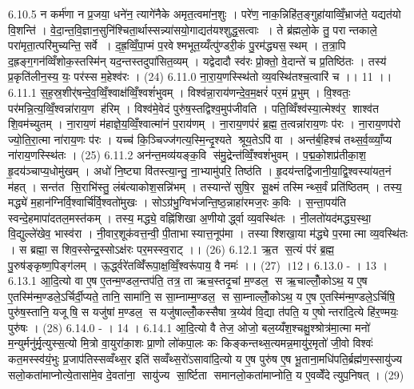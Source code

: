 6.10.5
न कर्म॑णा न प्र॒जया॒ धने॑न॒ त्यागे॑नैके अमृत॒त्वमा॑न॒शुः । परे॑ण॒ नाक॒न्निहि॑त॒ङ्गुहा॑याव्विँ॒भ्राज॑ते॒ यद्यत॑यो वि॒शन्ति॑ । वे॒दा॒न्त॒वि॒ज्ञान॒सुनि॑श्चिता॒र्थास्सन्न्या॑सयो॒गाद्यत॑यश्शुद्ध॒सत्वाः । ते ब्र॑ह्मलो॒के तु॒ परान्तकाले॒ परा॑मृता॒त्परि॑मुच्यन्ति॒ सर्वे । द॒ह्र॒व्विँ॒पा॒प्मं प॒रवेश्मभूत॒य्यँत्पु॑ण्डरी॒कं पु॒रम॑द्ध्यस॒॒स्थम् । त॒त्रा॒पि द॒ह्रङ्ग॒गन॑व्विँशोक॒स्तस्मि॑न् यद॒न्तस्तदुपा॑सित॒व्यम् । यद्वेदादौ स्व॑रः प्रो॒क्तो॒ वे॒दान्ते॑ च प्र॒तिष्ठि॑तः । तस्य॑ प्र॒कृति॑लीन॒स्य॒ यः॒ पर॑स्स म॒हेश्व॑रः । (24)
6.11.0
ना॒रा॒य॒णस्स्थि॑तो व्य॒वस्थि॑तश्च॒त्वारि॑ च ।। 11 ।।
6.11.1
स॒ह॒स्र॒शीर्॑षन्दे॒व॒व्विँ॒श्वाक्ष॑व्विँ॒श्वशं॑भुवम् । विश्व॑न्ना॒राय॑णन्दे॒व॒म॒क्षरं॑ पर॒मं प्र॒भुम् । वि॒श्वतः॒ पर॑मन्नि॒त्य॒व्विँ॒श्वन्ना॑राय॒ण ह॑रिम् । विश्व॑मे॒वेदं पुरु॑ष॒स्तद्विश्व॒मुप॑जीवति । पति॒व्विँश्व॑स्या॒त्मेश्व॑र॒॒ शाश्व॑त शि॒वम॑च्युतम् । ना॒राय॒णं म॑हाज्ञे॒य॒व्विँ॒श्वात्मा॑नं प॒राय॑णम् । ना॒राय॒णप॑रं ब्र॒ह्म॒ त॒त्वन्ना॑राय॒णः प॑रः । ना॒राय॒णप॑रो ज्यो॒ति॒रा॒त्मा ना॑राय॒णः प॑रः । यच्च॑ कि॒ञ्चिज्ज॑गत्य॒स्मि॒न्दृ॒श्यते श्रूय॒तेऽपि॑ वा । अन्त॑र्ब॒हिश्च॑ तथ्स॒र्व॒व्व्याँ॒प्य ना॑राय॒णस्स्थि॑तः । (25)
6.11.2
अन॑न्त॒मव्य॑यङ्क॒वि स॑मु॒द्रेन्त॑व्विँ॒श्वशं॑भुवम् । प॒द्म॒को॒शप्र॑तीका॒श॒॒ हृ॒दय॑ञ्चाप्य॒धोमु॑खम् । अधो॑ नि॒ष्ट्या वि॑तस्त्या॒न्तु॒ ना॒भ्यामु॑परि॒ तिष्ठ॑ति । हृ॒दय॑न्तद्वि॑जानी॒या॒द्वि॒श्वस्या॑यत॒नं म॑हत् । सन्त॑त सि॒राभि॑स्तु॒ लंब॑त्याकोश॒सन्नि॑भम् । तस्यान्ते॑ सुषि॒र सू॒क्ष्मं तस्मिन्थ्स॒र्वं प्रति॑ष्ठितम् । तस्य॒ मद्ध्ये॑ म॒हान॑ग्निर्वि॒श्वार्चि॑र्वि॒श्वतो॑मुखः । सोऽग्र॑भु॒ग्विभ॑जन्ति॒ष्ठ॒न्नाहा॑रमज॒रः क॒विः । स॒न्ता॒पय॑ति स्वन्दे॒हमापा॑दतल॒मस्त॑कम् । तस्य॒ मद्ध्ये॒ वह्नि॑शिखा अ॒णीयोर्द्ध्वा व्य॒वस्थि॑तः । नी॒लतो॑यद॑मद्ध्य॒स्था॒ वि॒द्युल्ले॑खेव॒ भास्व॑रा । नी॒वार॒शूक॑वत्त॒न्वी॒ पी॒ताभास्यात्त॒नूप॑मा । तस्याश्शिखा॒या म॑द्ध्ये प॒रमात्मा व्य॒वस्थि॑तः । स ब्रह्मा॒ स शिव॒स्सेन्द्र॒स्सोऽक्ष॑रः पर॒मस्स्व॒राट् ।। (26)
6.12.1
ऋ॒त स॒त्यं प॑रं ब्र॒ह्म॒ पु॒रुष॑ङ्कृष्ण॒पिङ्ग॑लम् । ऊ॒र्द्ध्वरे॑तव्विँ॑रूपा॒क्ष॒व्विँ॒श्वरू॑पाय॒ वै नमः॑ ।। (27) ।12।
6.13.0
- । 13 ।
6.13.1
आ॒दि॒त्यो वा ए॒ष ए॒तन्म॒ण्डल॒न्तप॑ति॒ तत्र॒ ता ऋच॒स्तदृ॒चां म॒ण्डल॒॒ स ऋ॒चाल्लोँ॒कोऽथ॒ य ए॒ष ए॒तस्मि॑न्म॒ण्डले॒ऽर्चिर्दी॒प्यते॒ तानि॒ सामा॑नि॒ स सा॒म्नाम्म॒ण्डल॒॒ स सा॒म्नाल्लोँ॒कोऽथ॒ य ए॒ष ए॒तस्मि॑न्म॒ण्डले॒ऽर्चिषि॒ पुरु॑ष॒स्तानि॒ यजू॑षि॒ स यजु॑षां म॒ण्डल॒॒ स यजु॑षाल्लोँ॒कस्सैषा त्र॒य्येव॑ वि॒द्या त॑पति॒ य ए॒षोन्तरा॑दि॒त्ये हि॑र॒ण्मयः॒ पुरु॑षः । (28)
6.14.0
- । 14 ।
6.14.1
आ॒दि॒त्यो वै तेज॒ ओजो॒ बल॒य्यँश॒श्चक्षु॒श्श्रोत्र॑मा॒त्मा मनो॑ म॒न्युर्मनु॑र्मृ॒त्युस्स॒त्यो मि॒त्रो वा॒युरा॑का॒शः प्रा॒णो लो॑कपा॒लः कः किङ्कन्तथ्स॒त्यमन्न॒मायु॑र॒मृतो॑ जी॒वो विश्वः॑ कत॒मस्स्व॑यं॒भुः प्र॒जाप॑तिस्सव्वँथ्स॒र इति॑ सव्वँथ्स॒रो॑ऽसावा॑दि॒त्यो य ए॒ष पुरु॑ष ए॒ष भू॒ताना॒मधि॑पति॒र्ब्रह्म॑ण॒स्सायु॑ज्य सलो॒कता॑माप्नोत्ये॒तासा॑मे॒व दे॒वता॑ना॒॒ सायु॑ज्य सा॒र्ष्टिता॑ समानलो॒कता॑माप्नोति॒ य ए॒वव्वेँदेत्युप॒निषत् । (29)
